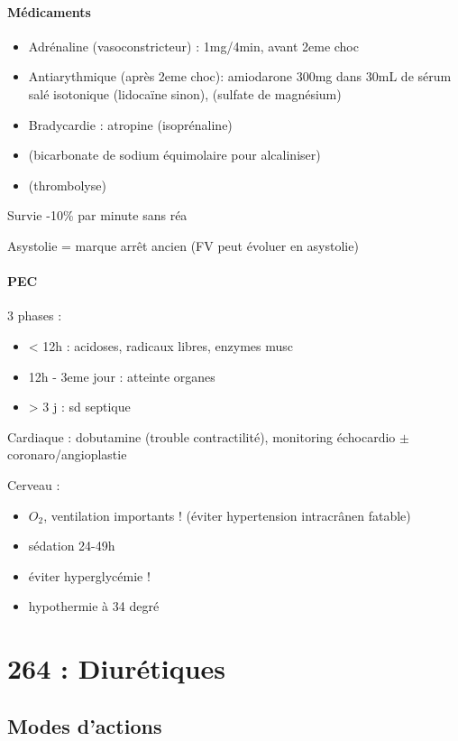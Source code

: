\documentclass{article}
\begin{document}
\paragraph{Médicaments}
\begin{itemize}
  \item Adrénaline (vasoconstricteur) : 1mg/4min, avant 2eme choc
  \item Antiarythmique (après 2eme choc): amiodarone 300mg dans 30mL de sérum
    salé isotonique (lidocaïne sinon), (sulfate
    de magnésium)
  \item Bradycardie : atropine (isoprénaline)
  \item (bicarbonate de sodium équimolaire pour alcaliniser)
  \item (thrombolyse)
\end{itemize}

Survie -10\% par minute sans réa

Asystolie = marque arrêt ancien (FV peut évoluer en asystolie)

\paragraph{PEC}
3 phases :
\begin{itemize}
  \item < 12h : acidoses, radicaux libres, enzymes musc
  \item 12h - 3eme jour : atteinte organes
  \item  > 3 j : sd septique
\end{itemize}

Cardiaque : dobutamine (trouble contractilité), monitoring échocardio $\pm$
coronaro/angioplastie

Cerveau :
\begin{itemize}
  \item $O_2$, ventilation importants ! (éviter hypertension intracrânen
    fatable)
  \item sédation 24-49h
  \item éviter hyperglycémie !
  \item hypothermie à 34 degré
\end{itemize}

\section{264 : Diurétiques}%
\label{sec:264_diuretiques}

\subsection{Modes d'actions}
\end{document}
